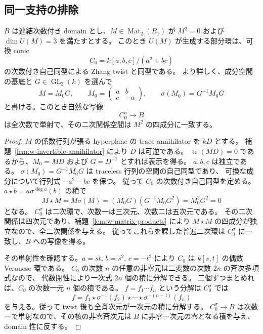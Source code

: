 \subsection{同一支持の排除}
\label{sec:w-distinct}

\begin{proposition}
\label{prop:w-conic-support}
$B$ は連結次数付き domain とし、$M\in\operatorname{Mat}_2(B_1)$ が
$M^2=0$ および $\dim U(M)=3$ を満たすとする。
このとき $U(M)$ が生成する部分環は、可換 conic
\[
 C_0=k[a,b,c]/(a^2+bc)
\]
の次数付き自己同型による Zhang twist と同型である。
より詳しく、成分空間の基底と $G\in\operatorname{GL}_2(k)$ を選んで
\[
 M=M_0G,\qquad M_0=\begin{pmatrix}a&b\\c&-a\end{pmatrix},\qquad
 \sigma(M_0)=G^{-1}M_0G
\]
と書ける。このとき自然な写像
\[
 C_0^\sigma\longrightarrow B
\]
は全次数で単射で、その二次関係空間は $M^2$ の四成分に一致する。
\end{proposition}
\begin{proof}
$M$ の係数行列が張る hyperplane の trace-annihilator を $kD$ とする。
補題~\ref{lem:w-invertible-annihilator} により $D$ は可逆である。
$\operatorname{tr}(MD)=0$ であるから、$M_0=MD$ および $G=D^{-1}$ とすれば表示を得る。
$a,b,c$ は独立である。
$\sigma(M_0)=G^{-1}M_0G$ は traceless 行列の空間の自己同型であり、
可換な成分について行列式 $-a^2-bc$ を保つ。
従って $C_0$ の次数付き自己同型を定める。
$a\star b=a\sigma^{\deg a}(b)$ の積で
\[
 M\star M=M\sigma(M)
   =(M_0G)(G^{-1}M_0G^2)=M_0^2G^2=0
\]
となる。
$C_0^\sigma$ は二次環で、次数一は三次元、次数二は五次元である。
その二次関係は四次元であり、補題~\ref{lem:w-matrix-products} により
$M\star M$ の四成分が独立なので、全二次関係を与える。
従ってこれらを課した普遍二次環は $C_0^\sigma$ に一致し、$B$ への写像を得る。

その単射性を確認する。$a=st$, $b=s^2$, $c=-t^2$ により
$C_0$ は $k[s,t]$ の偶数 Veronese 環である。
$C_0$ の次数 $n$ の任意の非零元は二変数の次数 $2n$ の斉次多項式なので、
代数閉性により一次式 $2n$ 個の積に分解できる。
二個ずつまとめれば、$C_0$ の次数一元 $n$ 個の積である。
$f=f_1\cdots f_n$ という分解は $C_0^\sigma$ では
\[
 f=f_1\star\sigma^{-1}(f_2)\star\cdots
        \star\sigma^{-(n-1)}(f_n)
\]
を与える。従って twist 後も全斉次元が一次元の積に分解する。
$C_0^\sigma\to B$ は次数一で単射なので、その核の非零斉次元は
$B$ に非零一次元の零となる積を与え、domain 性に反する。
\end{proof}

